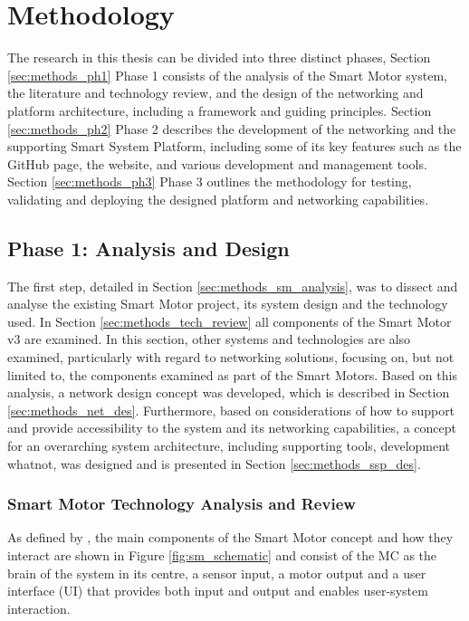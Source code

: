\cleardoublepage%
\chapter{\label{chap:methods}Methodology}%

The research in this thesis can be divided into three distinct phases, Section \ref{sec:methods_ph1} Phase 1 consists of the analysis of the Smart Motor system, the literature and technology review, and the design of the networking and platform architecture, including a framework and guiding principles. Section \ref{sec:methods_ph2} Phase 2 describes the development of the networking and the supporting Smart System Platform, including some of its key features such as the GitHub page, the website, and various development and management tools. Section \ref{sec:methods_ph3} Phase 3 outlines the methodology for testing, validating and deploying the designed platform and networking capabilities.

\section{\label{sec:methods_ph1}Phase 1: Analysis and Design}

The first step, detailed in Section \ref{sec:methods_sm_analysis}, was to dissect and analyse the existing Smart Motor project, its system design and the technology used. In Section \ref{sec:methods_tech_review} all components of the Smart Motor v3 are examined. 
In this section, other systems and technologies are also examined, particularly with regard to networking solutions, focusing on, but not limited to, the components examined as part of the Smart Motors. 
Based on this analysis, a network design concept was developed, which is described in Section \ref{sec:methods_net_des}. Furthermore, based on considerations of how to support and provide accessibility to the system and its networking capabilities, a concept for an overarching system architecture, including supporting tools, development whatnot, was designed and is presented in Section \ref{sec:methods_ssp_des}.

\subsection{\label{sec:methods_sm_analysis}Smart Motor Technology Analysis and Review}

As defined by \citet[]{dahal_designing_2024}, the main components of the Smart Motor concept and how they interact are shown in Figure \ref{fig:sm_schematic} and consist of the MC as the brain of the system in its centre, a sensor input, a motor output and a user interface (UI) that provides both input and output and enables user-system interaction.

